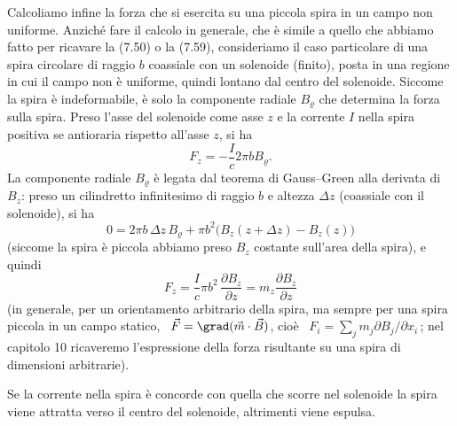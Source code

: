 Calcoliamo infine la forza che si esercita su una piccola spira in un campo non
uniforme. Anzich\'e fare il calcolo in generale, che \`e simile a quello che
abbiamo fatto per ricavare la (7.50) o la (7.59), consideriamo il caso
particolare di una spira circolare di raggio $b$ coassiale con un solenoide
(finito), posta in una regione in cui il campo non \`e uniforme, quindi lontano
dal centro del solenoide. Siccome la spira \`e indeformabile, \`e solo la
componente radiale $B_\varrho$ che determina la forza sulla spira. Preso l'asse
del solenoide come asse $z$ e la corrente $I$ nella spira positiva se antioraria
rispetto all'asse $z$, si ha
\begin{equation}
  F_z=-\frac{I}{c}2\pi bB_\varrho.
  \tag{7.60}
\end{equation}
La componente radiale $B_\varrho$ \`e legata dal teorema di Gauss--Green alla
derivata di $B_z$: preso un cilindretto infinitesimo di raggio $b$ e altezza
$\Delta z$ (coassiale con il solenoide), si ha
\begin{equation}
  0=2\pi b\,\Delta z\,B_\varrho+\pi b^2\big(B_z(z+\Delta z)-B_z(z)\big)
  \tag{7.61}
\end{equation}
(siccome la spira \`e piccola abbiamo preso $B_z$ costante sull'area della
spira), e quindi
\begin{equation}
  F_z=\frac{I}{c}\pi b^2\,\frac{\partial B_z}{\partial z}
  =m_z\frac{\partial B_z}{\partial z}
  \tag{7.62}
\end{equation}
(in generale, per un orientamento arbitrario della spira, ma sempre per una
spira piccola in un campo statico, \ $\vec F=\grad(\vec m\cdot\vec B)$, cio\`e
\ $F_i=\sum_jm_j\partial B_j/\partial x_i$\,; nel capitolo 10 ricaveremo
l'espressione della forza risultante su una spira di dimensioni arbitrarie).

Se la corrente nella spira \`e concorde con quella che scorre nel solenoide la
spira viene attratta verso il centro del solenoide, altrimenti viene espulsa.

